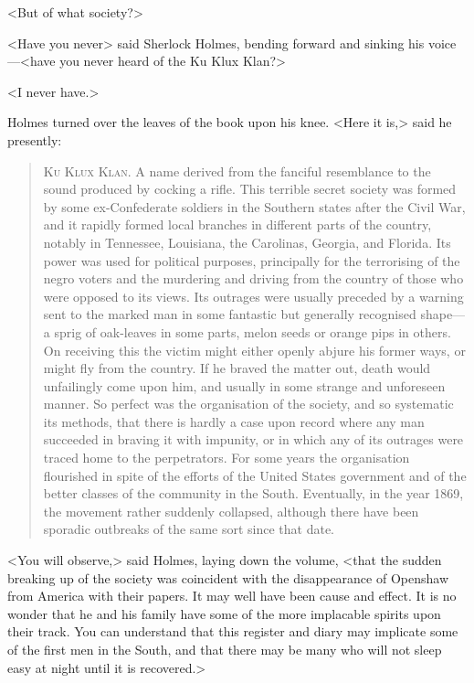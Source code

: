 <But of what society?>

<Have you never\longdash> said Sherlock Holmes, bending forward and sinking his voice—<have you never heard of the Ku Klux Klan?>

<I never have.>

Holmes turned over the leaves of the book upon his knee. <Here it is,> said he presently:

\begin{quote}
\textsc{Ku Klux Klan}. A name derived from the fanciful resemblance to the sound produced by cocking a rifle. This terrible secret society was formed by some ex-Confederate soldiers in the Southern states after the Civil War, and it rapidly formed local branches in different parts of the country, notably in Tennessee, Louisiana, the Carolinas, Georgia, and Florida. Its power was used for political purposes, principally for the terrorising of the negro voters and the murdering and driving from the country of those who were opposed to its views. Its outrages were usually preceded by a warning sent to the marked man in some fantastic but generally recognised shape—a sprig of oak-leaves in some parts, melon seeds or orange pips in others. On receiving this the victim might either openly abjure his former ways, or might fly from the country. If he braved the matter out, death would unfailingly come upon him, and usually in some strange and unforeseen manner. So perfect was the organisation of the society, and so systematic its methods, that there is hardly a case upon record where any man succeeded in braving it with impunity, or in which any of its outrages were traced home to the perpetrators. For some years the organisation flourished in spite of the efforts of the United States government and of the better classes of the community in the South. Eventually, in the year 1869, the movement rather suddenly collapsed, although there have been sporadic outbreaks of the same sort since that date.
\end{quote}

<You will observe,> said Holmes, laying down the volume, <that the sudden breaking up of the society was coincident with the disappearance of Openshaw from America with their papers. It may well have been cause and effect. It is no wonder that he and his family have some of the more implacable spirits upon their track. You can understand that this register and diary may implicate some of the first men in the South, and that there may be many who will not sleep easy at night until it is recovered.>

